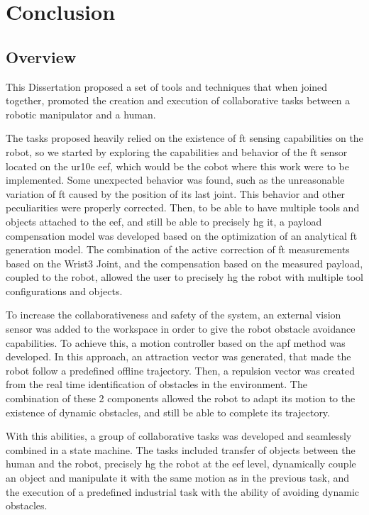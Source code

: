 \chapter{Conclusion}

\section{Overview}

\par This Dissertation proposed a set of tools and techniques that when joined together, promoted the creation and execution of collaborative tasks between a robotic manipulator and a human. 
\par The tasks proposed heavily relied on the existence of \ac{ft} sensing capabilities on the robot, so we started by exploring the capabilities and behavior of the \ac{ft} sensor located on the \ac{ur10e} \ac{eef}, which would be the cobot where this work were to be implemented. Some unexpected behavior was found, such as the unreasonable variation of \ac{ft} caused by the position of its last joint. This behavior and other peculiarities were properly corrected. Then, to be able to have multiple tools and objects attached to the \ac{eef}, and still be able to precisely \ac{hg} it, a payload compensation model was developed based on the optimization of an analytical \ac{ft} generation model. The combination of the active correction of \ac{ft} measurements based on the Wrist3 Joint, and the compensation based on the measured payload, coupled to the robot, allowed the user to precisely \ac{hg} the robot with multiple tool configurations and objects.
\par To increase the collaborativeness and safety of the system, an external vision sensor was added to the workspace in order to give the robot obstacle avoidance capabilities. To achieve this, a motion controller based on the \ac{apf} method was developed. In this approach, an attraction vector was generated, that made the robot follow a predefined offline trajectory. Then, a repulsion vector was created from the real time identification of obstacles in the environment. The combination of these 2 components allowed the robot to adapt its motion to the existence of dynamic obstacles, and still be able to complete its trajectory.
\par With this abilities, a group of collaborative tasks was developed and seamlessly combined in a state machine. The tasks included transfer of objects between the human and the robot, precisely \ac{hg} the robot at the \ac{eef} level, dynamically couple an object and manipulate it with the same motion as in the previous task, and the execution of a predefined industrial task with the ability of avoiding dynamic obstacles.
